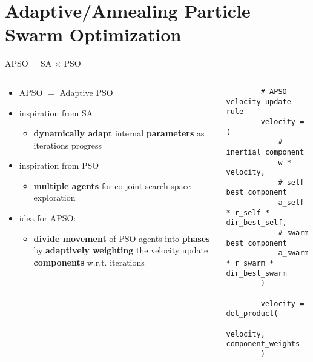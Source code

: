 \documentclass[11pt,aspectratio=169]{beamer}
\begin{document}
%
%

\section{Adaptive/Annealing Particle Swarm Optimization}

%
%

\begin{frame}[fragile]{APSO = SA $\times$ PSO}
    \begin{columns}
    \begin{column}{0.45\textwidth}
        \begin{itemize}
            \item APSO $=$ Adaptive PSO
            \item inspiration from SA
            \begin{itemize}
                \item \textbf{dynamically adapt} internal \textbf{parameters} as iterations progress
            \end{itemize}
            \item inspiration from PSO
            \begin{itemize}
                \item \textbf{multiple agents} for co-joint search space exploration
            \end{itemize}
            \item idea for APSO:
            \begin{itemize}
                \item \textbf{divide movement} of PSO agents into \textbf{phases} by \textbf{adaptively weighting} the velocity update \textbf{components} w.r.t. iterations
            \end{itemize}
        \end{itemize}
    \end{column}

    \begin{column}{0.6\textwidth}
        \begin{verbatim}
        # APSO velocity update rule
        velocity = (
            # inertial component
            w * velocity,
            # self best component
            a_self * r_self * dir_best_self,
            # swarm best component
            a_swarm * r_swarm * dir_best_swarm
        )

        velocity = dot_product(
            velocity, component_weights
        )
        \end{verbatim}
    \end{column}
    \end{columns}
\end{frame}
\end{document}
